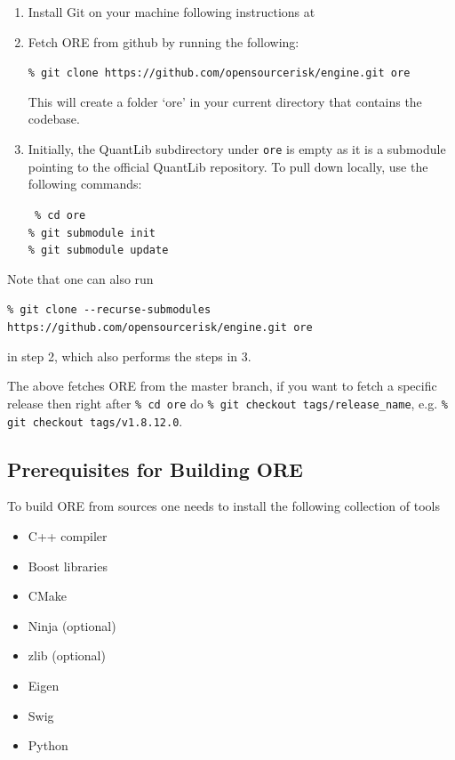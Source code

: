 \begin{enumerate}
\item Install Git on your machine following instructions at \cite{git-download}

\item Fetch ORE from github by running the following:

{\tt\% git clone https://github.com/opensourcerisk/engine.git ore}

This will create a folder `ore' in your current directory that contains the codebase.

\item Initially, the QuantLib subdirectory under {\tt ore} is empty as it is a submodule pointing to the official
  QuantLib repository. To pull down locally, use the following commands:

{\tt
\% cd ore \\
\% git submodule init \\
\% git submodule update
}

\end{enumerate}

Note that one can also run

{\footnotesize \tt\% git clone -{}-recurse-submodules https://github.com/opensourcerisk/engine.git ore}

in step 2, which also performs the steps in 3.

The above fetches ORE from the master branch, if you want to fetch a specific release then right after {\tt\% cd ore} do {\tt\% git checkout tags/release\_name}, e.g. {\tt\% git checkout tags/v1.8.12.0}.

\subsection{Prerequisites for Building ORE}
\label{sec:prerequisites}

To build ORE from sources one needs to install the following collection of tools
\begin{itemize}
\item C++ compiler
\item Boost libraries
\item CMake
\item Ninja (optional)
\item zlib (optional)
\item Eigen
\item Swig
\item Python
\end{itemize}

